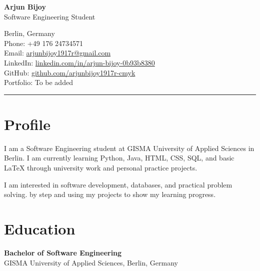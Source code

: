 \documentclass[11pt,a4paper]{article}
\begin{document}

\begin{center}

    \vspace{0.2cm}

    {\LARGE \textbf{Arjun Bijoy}}\\
    \vspace{0.1cm}
    Software Engineering Student\\
    \vspace{0.2cm}

    Berlin, Germany \\
    Phone: +49 176 24734571 \\
    Email: \href{mailto:arjunbijoy1917r@gmail.com}{arjunbijoy1917r@gmail.com} \\
    LinkedIn: \href{https://linkedin.com/in/arjun-bijoy-0b93b8380}{linkedin.com/in/arjun-bijoy-0b93b8380} \\
    GitHub: \href{https://github.com/arjunbijoy1917r-cmyk}{github.com/arjunbijoy1917r-cmyk} \\
    Portfolio: To be added
\end{center}

\vspace{0.3cm}
\hrule
\vspace{0.4cm}


\section*{Profile}

I am a Software Engineering student at GISMA University of Applied Sciences in Berlin. I am currently learning Python, Java, HTML, CSS, SQL, and basic LaTeX through university work and personal practice projects.

I am interested in software development, databases, and practical problem solving.  by step and using my projects to show my learning progress.


\section*{Education}

\textbf{Bachelor of Software Engineering} \\
GISMA University of Applied Sciences, Berlin, Germany \\
\end{document}
